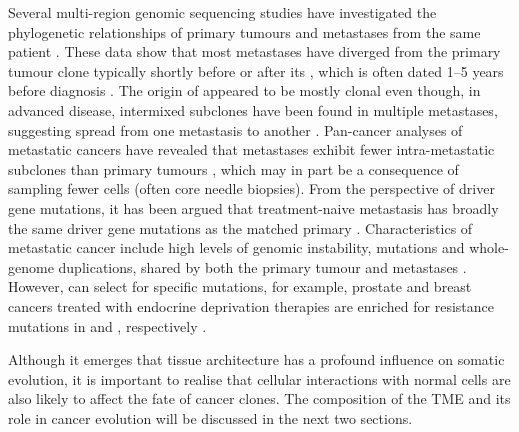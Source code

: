 Several multi-region genomic sequencing studies have investigated the phylogenetic relationships of primary tumours and metastases from the same patient \parencite{Gerlinger2012-qm,De_Bruin2014-ow,Yates2015-xk,Jamal-Hanjani2017-uv,Jones2008-sd,Mamlouk2017-wt,Zhou2021-oj,Yates2017-xc,Noorani2020-dp,Karlsson2018-kv}. These data show that most metastases have diverged from the primary tumour clone typically shortly before or after its , which is often dated 1–5 years before diagnosis \parencite{Yates2017-xc,Noorani2020-dp,Gundem2015-kg,Hu2020-ui}. The origin of  appeared to be mostly clonal \parencite{Brastianos2015-ox,Brown2017-de,De_Mattos-Arruda2019-sb} even though, in advanced disease, intermixed subclones have been found in multiple metastases, suggesting spread from one metastasis to another \parencite{Noorani2020-dp,Gundem2015-kg,Aceto2014-lu}. Pan-cancer analyses of metastatic cancers have revealed that metastases exhibit fewer intra-metastatic subclones than primary tumours \parencite{Priestley2019-wi,Martinez-Jimenez2022-tl,Nguyen2022-jr}, which may in part be a consequence of sampling fewer cells (often core needle biopsies). From the perspective of driver gene mutations, it has been argued that treatment-naive metastasis has broadly the same driver gene mutations as the matched primary \parencite{Reiter2019-bc}. Characteristics of metastatic cancer include high levels of genomic instability,  mutations and whole-genome duplications, shared by both the primary tumour and metastases \parencite{Priestley2019-wi,Nguyen2022-jr}. However,  can select for specific mutations, for example, prostate and breast cancers treated with endocrine deprivation therapies are enriched for resistance mutations in  and , respectively \parencite{Martinez-Jimenez2022-tl,Nguyen2022-jr}.

Although it emerges that tissue architecture has a profound influence on somatic evolution, it is important to realise that cellular interactions with normal cells are also likely to affect the fate of cancer clones. The composition of the TME and its role in cancer evolution will be discussed in the next two sections.


